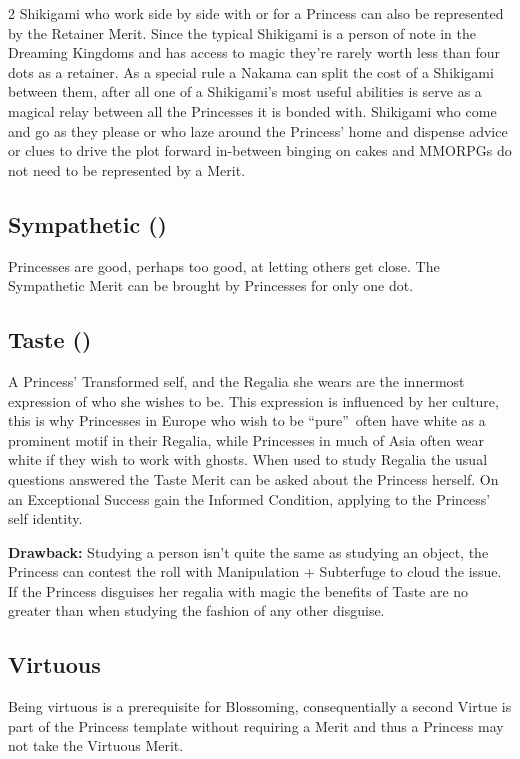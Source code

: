 \begin{multicols}{2}
Shikigami who work side by side with or for a Princess can also be represented by the Retainer Merit. Since the typical Shikigami is a person of note in the Dreaming Kingdoms and has access to magic they're rarely worth less than four dots as a retainer. As a special rule a Nakama can split the cost of a Shikigami between them, after all one of a Shikigami's most useful abilities is serve as a magical relay between all the Princesses it is bonded with. Shikigami who come and go as they please or who laze around the Princess' home and dispense advice or clues to drive the plot forward in-between binging on cakes and MMORPGs do not need to be represented by a Merit. 

\subsection*{Sympathetic (\textbullet)}

Princesses are good, perhaps too good, at letting others get close. The Sympathetic Merit can be brought by Princesses for only one dot. 

\subsection*{Taste (\textbullet)}

A Princess' Transformed self, and the Regalia she wears are the innermost expression of who she wishes to be. This expression is influenced by her culture, this is why Princesses in Europe who wish to be \textquotedblleft pure\textquotedblright\, often have white as a prominent motif in their Regalia, while Princesses in much of Asia often wear white if they wish to work with ghosts. When used to study Regalia the usual questions answered the Taste Merit can be asked about the Princess herself. On an Exceptional Success gain the Informed Condition, applying to the Princess' self identity. 

\textbf{Drawback:} Studying a person isn't quite the same as studying an object, the Princess can contest the roll with Manipulation + Subterfuge to cloud the issue. If the Princess disguises her regalia with magic the benefits of Taste are no greater than when studying the fashion of any other disguise.

\subsection*{Virtuous}

Being virtuous is a prerequisite for Blossoming, consequentially a second Virtue is part of the Princess template without requiring a Merit and thus a Princess may not take the Virtuous Merit.



\end{multicols}
